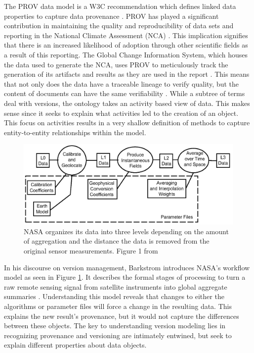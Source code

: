 The PROV data model is a W3C recommendation which defines linked data properties to capture data provenance \cite{Gil2013}.
PROV has played a significant contribution in maintaining the quality and reproducibility of data sets and reporting in the National Climate Assessment (NCA) \cite{Ma2014191}.
This implication signifies that there is an increased likelihood of adoption through other scientific fields as a result of this reporting.
The Global Change Information System, which houses the data used to generate the NCA, uses PROV to meticulously track the generation of its artifacts and results as they are used in the report \cite{Tilmes2012}.
This means that not only does the data have a traceable lineage to verify quality, but the content of documents can have the same verifiability \cite{Ma2014}.
While a subtree of terms deal with versions, the ontology takes an activity based view of data.
This makes sense since it seeks to explain what activities led to the creation of an object.
This focus on activities results in a very shallow definition of methods to capture entity-to-entity relationships within the model.

\begin{figure}
	\centering
	\includegraphics[scale=0.35]{figures/NASALevels.png}
	\caption[NASA organizes its data into three levels depending on the amount of aggregation and the distance the data is removed from the original sensor measurements.]{NASA organizes its data into three levels depending on the amount of aggregation and the distance the data is removed from the original sensor measurements. Figure 1 from \cite{Barkstrom2003}}
	\label{NASALevels}
\end{figure}

In his discourse on version management, Barkstrom introduces NASA's workflow model as seen in Figure \ref{NASALevels}.
It describes the formal stages of processing to turn a raw remote sensing signal from satellite instruments into global aggregate summaries \cite{Barkstrom2003}.
Understanding this model reveals that changes to either the algorithms or parameter files will force a change in the resulting data.
This explains the new result's provenance, but it would not capture the differences between these objects.
The key to understanding version modeling lies in recognizing provenance and versioning are intimately entwined, but seek to explain different properties about data objects.

